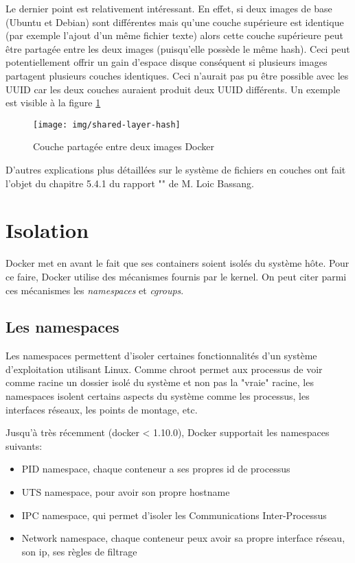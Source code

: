 Le dernier point est relativement intéressant. En effet, si deux images de base (Ubuntu et Debian) sont différentes mais qu'une couche supérieure est identique (par exemple l'ajout d'un même fichier texte) alors cette couche supérieure peut être partagée entre les deux images (puisqu'elle possède le même hash). Ceci peut potentiellement offrir un gain d'espace disque conséquent si plusieurs images partagent plusieurs couches identiques. Ceci n'aurait pas pu être possible avec les UUID car les deux couches auraient produit deux UUID différents. Un exemple est visible à la figure \ref{shared-layer-hash}

\begin{figure}[hbtp]
\centering
\texttt{[image: img/shared-layer-hash]}
\caption{Couche partagée entre deux images Docker}
\label{shared-layer-hash}
\end{figure}

D'autres explications plus détaillées sur le système de fichiers en couches ont fait l'objet du chapitre 5.4.1 du rapport "\bassangPrjSemestre" de M. Loic Bassang.


\section{Isolation}\label{pres-docker-isolation}
Docker met en avant le fait que ses containers soient isolés du système hôte. Pour ce faire, Docker utilise des mécanismes fournis par le kernel. On peut citer parmi ces mécanismes les \textit{namespaces} et \textit{cgroups}.

\subsection{Les namespaces}
Les namespaces permettent d'isoler certaines fonctionnalités d'un système d'exploitation utilisant Linux. Comme chroot permet aux processus de voir comme racine un dossier isolé du système et non pas la "vraie" racine, les namespaces isolent certains aspects du système comme les processus, les interfaces réseaux, les points de montage, etc.

Jusqu'à très récemment (docker < 1.10.0), Docker supportait les namespaces suivants\cite{docker_1_10_user_namespace}:

\begin{itemize}
\item PID namespace, chaque conteneur a ses propres id de processus
\item UTS namespace, pour avoir son propre hostname
\item IPC namespace, qui permet d'isoler les Communications Inter-Processus
\item Network namespace, chaque conteneur peux avoir sa propre interface réseau, son ip, ses règles de filtrage
\end{itemize}

